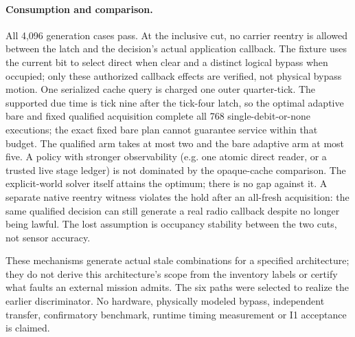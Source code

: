 \documentclass{article}
\begin{document}
\paragraph{Consumption and comparison.}
All 4,096 generation cases pass. At the inclusive cut, no carrier
reentry is allowed between the latch and the decision's actual
application callback. The fixture uses the current bit to select
direct when clear and a distinct logical bypass when occupied;
only these authorized callback effects are verified, not physical
bypass motion. One serialized cache query is charged one outer
quarter-tick. The supported due time is tick nine after the tick-four
latch, so the optimal adaptive bare and fixed qualified acquisition
complete all 768 single-debit-or-none executions; the exact fixed
bare plan cannot guarantee service within that budget. The qualified
arm takes at most two and the bare adaptive arm at most five.
A policy with stronger observability (e.g. one atomic direct reader,
or a trusted live stage ledger) is not dominated by the opaque-cache
comparison. The explicit-world solver itself attains the optimum;
there is no gap against it. A separate native reentry witness violates
the hold after an all-fresh acquisition: the same qualified decision
can still generate a real radio callback despite no longer being
lawful. The lost assumption is occupancy stability between the two
cuts, not sensor accuracy.

These mechanisms generate actual stale combinations for a specified
architecture; they do not derive this architecture's scope from the
inventory labels or certify what faults an external mission admits.
The six paths were selected to realize the earlier discriminator.
No hardware, physically modeled bypass, independent transfer,
confirmatory benchmark, runtime timing measurement or I1 acceptance
is claimed.
\end{document}
